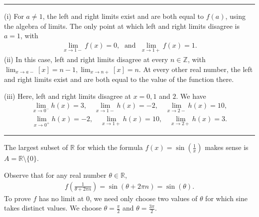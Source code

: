 \documentclass[letterpaper,10pt,english]{jupyterBook}
\begin{document}
\bigskip\hrule\bigskip


\sphinxAtStartPar
{\hyperref[\detokenize{Problems:id8}]{}} 

\sphinxAtStartPar
(i) For \(a\neq 1\), the left and right limits exist and are both equal to \(f(a)\), using the algebra of limits. The only point at which left and right limits disagree is \(a = 1\), with
\begin{equation*}
\begin{split}
\lim_{x \rightarrow 1-}f(x) = 0, \; \text{ and } \; \lim_{x \rightarrow 1+}f(x) = 1.
\end{split}
\end{equation*}
\sphinxAtStartPar
(ii) In this case, left and right limits disagree at every \(n \in \mathbb{Z}\), with \(\lim_{x \rightarrow a-}[x] = n-1, \lim_{x \rightarrow n+}[x] = n\). At every other real number, the left and right limits exist and are both equal to the value of the function there.

\sphinxAtStartPar
(iii) Here, left and right limits disagree at \(x = 0, 1\) and \(2\). We have
\begin{equation*}
\begin{split}
\lim_{x \rightarrow 0^-}h(x) = 3, \hspace{1em} \lim_{x \rightarrow 1-}h(x) = -2, \hspace{1em}  \lim_{x \rightarrow 2-}h(x) = 10,
\end{split}
\end{equation*}\begin{equation*}
\begin{split}
\lim_{x \rightarrow 0^+}h(x) = -2, \hspace{1em} \lim_{x \rightarrow 1+}h(x) = 10, \hspace{1em}  \lim_{x \rightarrow 2+}h(x) = 3.
\end{split}
\end{equation*}

\bigskip\hrule\bigskip


\sphinxAtStartPar
{\hyperref[\detokenize{Problems:id9}]{}}  The largest subset of \(\mathbb{R}\) for which the formula \(f(x)=\sin\left(\frac{1}{x}\right)\) makes sense is \(A = \mathbb{R} \setminus \{0\}\).

Observe that for any real number \(\theta\in\mathbb{R}\),
\begin{equation*}
\begin{split}
f\left(\frac{1}{\theta+2\pi n}\right) = \sin(\theta+2\pi n) = \sin(\theta).
\end{split}
\end{equation*}
\sphinxAtStartPar
To prove \(f\) has no limit at \(0\), we need only choose two values of \(\theta\) for which sine takes distinct values. We choose \(\theta=\frac{\pi}{2}\) and \(\theta=\frac{3\pi}{2}\).
\end{document}

